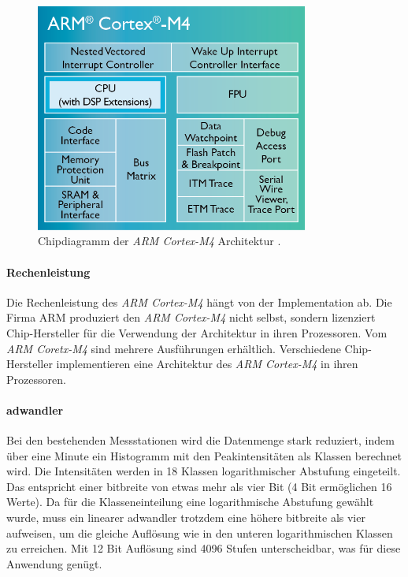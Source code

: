 \begin{figure}
	\centering
		\includegraphics[width=0.8\textwidth]{images/datasheets/Cortex-M4-chip-diagram-LG.png}
	\caption{Chipdiagramm der \emph{ARM Cortex-M4} Architektur \cite{armcortex}.}
	\label{fig.M4diagramm}
\end{figure}

\paragraph{Rechenleistung} Die Rechenleistung des \emph{ARM Cortex-M4} hängt von der Implementation ab. Die Firma ARM produziert den \emph{ARM Cortex-M4} nicht selbst, sondern lizenziert Chip-Hersteller für die Verwendung der Architektur in ihren Prozessoren. Vom \emph{ARM Coretx-M4} sind mehrere Ausführungen erhältlich. Verschiedene Chip-Hersteller implementieren eine Architektur des \emph{ARM Cortex-M4} in ihren Prozessoren.

\paragraph{\gls{adwandler}} Bei den bestehenden Messstationen wird die Datenmenge stark reduziert, indem über eine Minute ein Histogramm mit den Peakintensitäten als Klassen berechnet wird. Die Intensitäten werden in 18 Klassen logarithmischer Abstufung eingeteilt. Das entspricht einer \gls{bitbreite} von etwas mehr als vier Bit (4 Bit ermöglichen 16 Werte). Da für die Klasseneinteilung eine logarithmische Abstufung gewählt wurde, muss ein linearer \gls{adwandler} trotzdem eine höhere \gls{bitbreite} als vier aufweisen, um die gleiche Auflösung wie in den unteren logarithmischen Klassen zu erreichen. Mit 12 Bit Auflösung sind 4096 Stufen unterscheidbar, was für diese Anwendung genügt.

